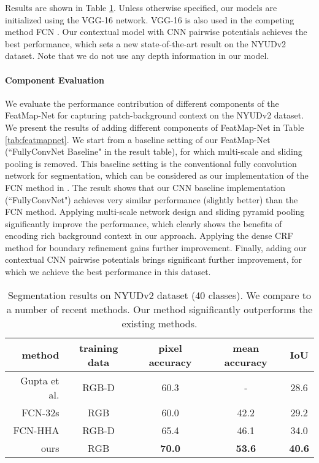 %
%
%
%
%
%

%
%


Results are shown in Table \ref{tab:nyud}.
%
Unless otherwise specified, our models are initialized using the VGG-16 network.
VGG-16 is also used in the competing method FCN \cite{LongSD14}.
Our contextual model with CNN pairwise potentials achieves the best performance, which sets a new state-of-the-art result on the NYUDv2 dataset.
Note that we do not use any depth information in our model.





%
%

\paragraph{Component Evaluation}
We evaluate the performance contribution of different components of the FeatMap-Net for capturing patch-background context on the NYUDv2 dataset.
We present the results of adding different components of FeatMap-Net in Table \ref{tab:featmapnet}.
We start from a baseline setting of our FeatMap-Net (``FullyConvNet Baseline" in the result table), for which multi-scale and sliding pooling is removed.
This baseline setting is the conventional fully convolution network
for segmentation, which can be considered as our implementation of the FCN method in \cite{LongSD14}.
The result shows that our CNN baseline implementation (``FullyConvNet") achieves very similar performance (slightly better) than the FCN method.
Applying multi-scale network design and sliding pyramid pooling significantly improve the performance,
which clearly shows the benefits of encoding rich background context in our approach.
Applying the dense CRF method \cite{krahenbuhl2012efficient} for boundary refinement gains further improvement.
Finally, adding our contextual CNN pairwise potentials brings significant further improvement, for which we achieve the best performance in this dataset.





\begin{table}[t]
\caption{Segmentation results on NYUDv2 dataset (40 classes).
We compare to a number of recent methods.
Our method significantly outperforms the existing methods.}
\centering
\resizebox{1\linewidth}{!}
  {
  \begin{tabular}{ r | c | c c c }
method  &training data  &pixel accuracy &mean accuracy  &IoU\\ \hline \hline
Gupta et al. \cite{gupta2014learning}   &RGB-D  &60.3 &-  &28.6\\
FCN-32s \cite{LongSD14} &RGB  &60.0 &42.2 &29.2\\
FCN-HHA \cite{LongSD14} &RGB-D  &65.4 &46.1 &34.0\\ \hline
%
ours  &RGB  &\bf 70.0 &\bf 53.6 &\bf 40.6\\
%
 \end{tabular}
  }
\label{tab:nyud}
\end{table}



